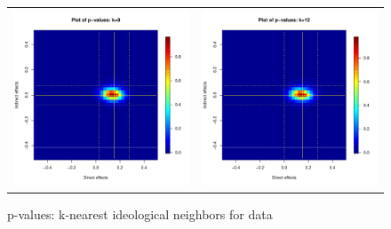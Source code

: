 \documentclass[12pt]{article}
\begin{document}
\begin{figure}
\begin{tabular}{cc}
	\includegraphics[scale=0.45]{./images/pval_plot_bergan_ideo_8nn.pdf} &
	\includegraphics[scale=0.45]{./images/pval_plot_bergan_ideo_12nn.pdf} \\ 
	\end{tabular}
	\caption{p-values: k-nearest ideological neighbors for \citet{bergan2015call} data}
\end{figure}
\end{document}
